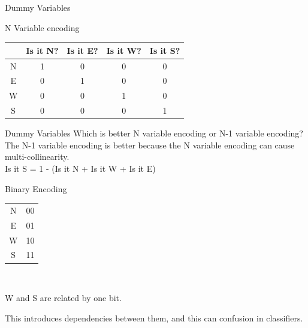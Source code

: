 \documentclass{beamer}
\begin{document}
    
    \begin{frame}{Dummy Variables}
    \begin{center}
    
    N Variable encoding\\
    \vspace{1em}
    \begin{tabular}{|c|c|c|c|c|}
    \hline
    & Is it N? &Is it E? &Is it W? & Is it S?\\
    \hline
    \hline
    N & 1&0&0&0 \\
    E & 0&1&0&0\\
    W & 0&0&1&0\\
    S & 0&0&0&1\\
    \hline
    \end{tabular}
    \end{center}
    \end{frame}
    
    
    
    \begin{frame}{Dummy Variables}
    Which is better N variable encoding or N-1 variable encoding? \\
    
    \pause The N-1 variable encoding is better because the N variable encoding can cause multi-collinearity. \\
    
    \pause Is it S = 1 - (Is it N + Is it W + Is it E) 
    
    \end{frame}
    
    
    \begin{frame}{Binary Encoding}
    
    \begin{center}
    \begin{tabular}{|c|c|}
    \hline
    N & 00 \\
    E& 01\\
    W & 10\\
    S& 11\\
    \hline
    \end{tabular}\\
    \end{center}
    
    
    \vspace{1em}
    \pause W and S are related by one bit. 
    
    \pause This introduces dependencies between them, and this can confusion in classifiers.
    \end{frame}
    
\end{document}
